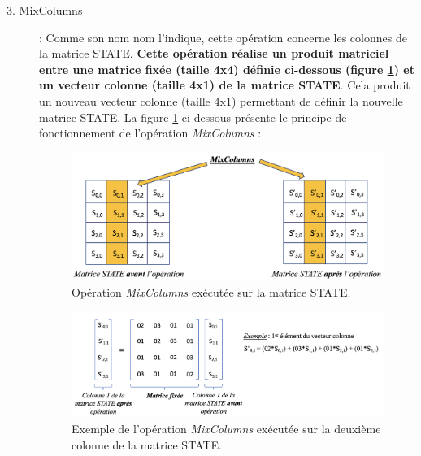 \documentclass[10pt, oneside, a4paper]{article}
\begin{document}
\begin{description}
\item[3. MixColumns] : Comme son nom nom l'indique, cette opération concerne les colonnes de la matrice STATE. \textbf{Cette opération réalise un produit matriciel entre une matrice fixée (taille 4x4) définie ci-dessous (figure \ref{fig:colonne}) et un vecteur colonne (taille 4x1) de la matrice STATE}. Cela produit un nouveau vecteur colonne (taille 4x1) permettant de définir la nouvelle matrice STATE.
La figure \ref{fig:colonne} ci-dessous présente le principe de fonctionnement de l'opération \textit{MixColumns} :
\begin{figure}[htbp]
    \centering
    \includegraphics[scale=0.45]{image/colonne}
    \caption{Opération \textit{MixColumns} exécutée sur la matrice STATE.}
    \label{fig:colonne}
\end{figure}
\begin{figure}[htbp]
    \centering
    \includegraphics[width=1\textwidth]{image/colonnebis}
    \caption{Exemple de l'opération \textit{MixColumns} exécutée sur la deuxième colonne de la matrice STATE.}
    \label{fig:colonnebis}
\end{figure}


\end{description}
\end{document}
